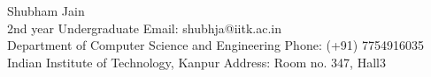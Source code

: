 \documentclass{article}
\begin{document}
{\Large Shubham Jain}
\\
2nd year Undergraduate \hfill Email: shubhja@iitk.ac.in
\\
Department of Computer Science and Engineering \hfill Phone: (+91) 7754916035
\\
Indian Institute of Technology, Kanpur  \hfill      Address: Room no. 347, Hall3
\end{document}
